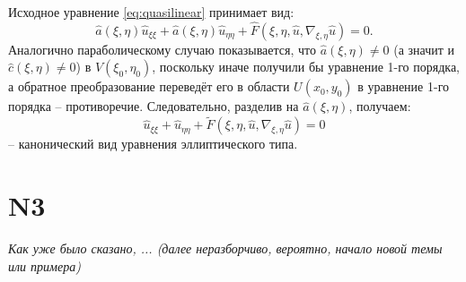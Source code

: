 \documentclass[12pt, a4paper]{article}
\begin{document}


Исходное уравнение \eqref{eq:quasilinear} принимает вид:
\[
\hat{a}(\xi,\eta)\hat{u}_{\xi\xi} + \hat{a}(\xi,\eta)\hat{u}_{\eta\eta} + \hat{F}(\xi,\eta,\hat{u},\nabla_{\xi,\eta}\hat{u}) = 0.
\]
Аналогично параболическому случаю показывается, что $\hat{a}(\xi,\eta) \neq 0$ (а значит и $\hat{c}(\xi,\eta) \neq 0$) в $V(\xi_0,\eta_0)$, поскольку иначе получили бы уравнение 1-го порядка, а обратное преобразование переведёт его в области $U(x_0,y_0)$ в уравнение 1-го порядка -- противоречие.
Следовательно, разделив на $\hat{a}(\xi,\eta)$, получаем:
\begin{equation} \label{eq:elliptic_canonical_final}
\boxed{
\hat{u}_{\xi\xi} + \hat{u}_{\eta\eta} + \tilde{F}(\xi,\eta,\hat{u},\nabla_{\xi,\eta}\hat{u}) = 0
}
\end{equation}
-- канонический вид уравнения эллиптического типа.

\hrulefill
\section*{N3}
\textit{Как уже было сказано, ... (далее неразборчиво, вероятно, начало новой темы или примера)}

\end{document}
